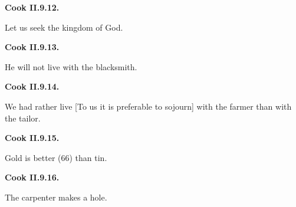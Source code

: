\par\begin{minipage}{\linewidth}\raggedright
\textbf{Cook II.9.12.}

Let us seek the kingdom of God.

\end{minipage}\par\addvspace{4pt}

\par\begin{minipage}{\linewidth}\raggedright
\textbf{Cook II.9.13.}

He will not live with the blacksmith.

\end{minipage}\par\addvspace{4pt}

\par\begin{minipage}{\linewidth}\raggedright
\textbf{Cook II.9.14.}

We had rather live [To us it is preferable to sojourn] with the farmer than with the tailor.

\end{minipage}\par\addvspace{4pt}

\par\begin{minipage}{\linewidth}\raggedright
\textbf{Cook II.9.15.}

Gold is better (66) than tin.

\end{minipage}\par\addvspace{4pt}

\par\begin{minipage}{\linewidth}\raggedright
\textbf{Cook II.9.16.}

The carpenter makes a hole.

\end{minipage}\par\addvspace{4pt}

